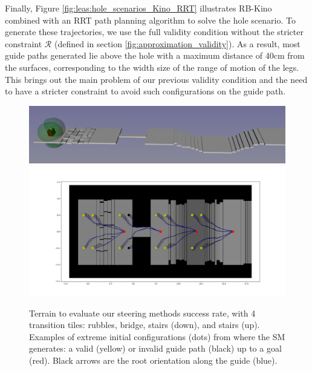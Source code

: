 Finally, Figure \ref{fig:leas:hole_scenarios_Kino_RRT} illustrates RB-Kino combined with an RRT path planning algorithm to solve the hole scenario. To generate these trajectories, we use the full validity condition without the stricter constraint $\mathcal{R}$ (defined in section \ref{fig:approximation_validity}). As a result, most guide paths generated lie above the hole with a maximum distance of 40cm from the surfaces, corresponding to the width size of the range of motion of the legs. 
This brings out the main problem of our previous validity condition and the need to have a stricter constraint to avoid such configurations on the guide path.



\begin{figure}[h!]
    \centering
    \includegraphics[width=\textwidth]{Figures/Chapter_LEAS/1x11_tests.png}
    \includegraphics[width=\textwidth]{Figures/Chapter_LEAS/1x11_example_180deg.png}
    \caption{Terrain to evaluate our steering methods success rate, with 4 transition tiles: rubbles, bridge, stairs (down), and stairs (up). Examples of extreme initial configurations (dots) from where the SM generates: a valid (yellow) or invalid guide path (black) up to a goal (red). Black arrows are the root orientation along the guide (blue).}
    \label{fig:tests_1x11}
\end{figure}

